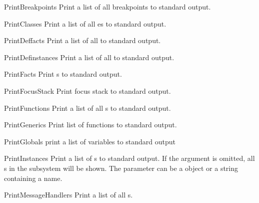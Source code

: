 \begin{funcdesc}{PrintBreakpoints}{}
Print a list of all breakpoints to standard output.
\end{funcdesc}

\begin{funcdesc}{PrintClasses}{}
Print a list of all es to standard output.
\end{funcdesc}

\begin{funcdesc}{PrintDeffacts}{}
Print a list of all  to standard output.
\end{funcdesc}

\begin{funcdesc}{PrintDefinstances}{}
Print a list of all  to standard output.
\end{funcdesc}

\begin{funcdesc}{PrintFacts}{}
Print s to standard output.
\end{funcdesc}

\begin{funcdesc}{PrintFocusStack}{}
Print focus stack to standard output.
\end{funcdesc}

\begin{funcdesc}{PrintFunctions}{}
Print a list of all s to standard output.
\end{funcdesc}

\begin{funcdesc}{PrintGenerics}{}
Print list of  functions to standard output.
\end{funcdesc}

\begin{funcdesc}{PrintGlobals}{}
print a list of  variables to standard output
\end{funcdesc}

\begin{funcdesc}{PrintInstances}{}
Print a list of s to standard output. If the 
argument is omitted, all s in the subsystem will be
shown. The  parameter can be a  object or a
string containing a  name.
\end{funcdesc}

\begin{funcdesc}{PrintMessageHandlers}{}
Print a list of all s.
\end{funcdesc}

